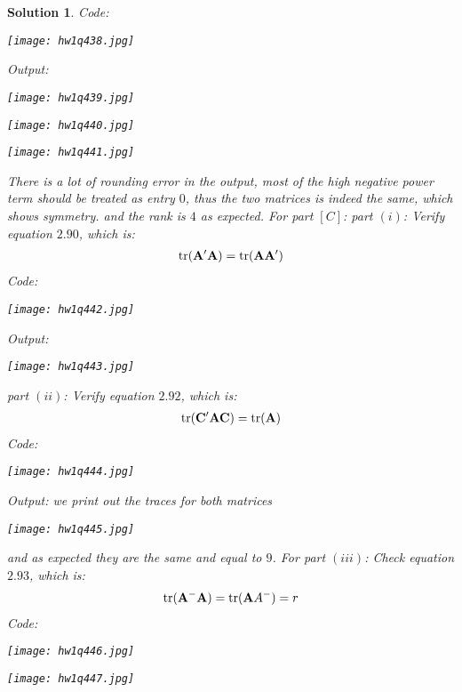 \documentclass[11pt]{article}\usepackage[]{graphicx}\usepackage[]{color}
\newtheorem{sol}{Solution}
\begin{document}
\begin{sol}
	Code:
	\begin{center}
		\texttt{[image: hw1q438.jpg]}
	\end{center}
	Output:
	\begin{center}
		\texttt{[image: hw1q439.jpg]}
	\end{center}
	\begin{center}
		\texttt{[image: hw1q440.jpg]}
	\end{center}
	\begin{center}
		\texttt{[image: hw1q441.jpg]}
	\end{center}
	There is a lot of rounding error in the output, most of the high negative power term should be treated as entry $0$, thus the two matrices is indeed the same, which shows symmetry. and the rank is $4$ as expected.\vskip 2mm
	For part $[C]$:\vskip 2mm
	part $(i)$:\vskip 2mm
	Verify equation $2.90$, which is:
	\begin{align*}
		\text{tr}({\bf A}'{\bf A}) = \text{tr}({\bf A}{\bf A'})
	\end{align*}
	Code:
	\begin{center}
		\texttt{[image: hw1q442.jpg]}
	\end{center}
	Output:
	\begin{center}
		\texttt{[image: hw1q443.jpg]}
	\end{center}
	part $(ii)$:\vskip 2mm
	Verify equation $2.92$, which is:
	\begin{align*}
		\text{tr}({\bf C}'{\bf A}{\bf C}) = \text{tr}({\bf A})
	\end{align*}
	Code:
	\begin{center}
		\texttt{[image: hw1q444.jpg]}
	\end{center}
	Output: we print out the traces for both matrices
	\begin{center}
		\texttt{[image: hw1q445.jpg]}
	\end{center}
	and as expected they are the same and equal to $9$.\vskip 2mm
	For part $(iii)$:\vskip 2mm
	Check equation $2.93$, which is:
	\begin{align*}
		\text{tr}({\bf A}^-{\bf A}) = \text{tr}({\bf A}{\bf }A^-) = r
	\end{align*}
	Code:
	\begin{center}
		\texttt{[image: hw1q446.jpg]}
	\end{center}
	\begin{center}
		\texttt{[image: hw1q447.jpg]}

\end{center}
\end{sol}
\end{document}
